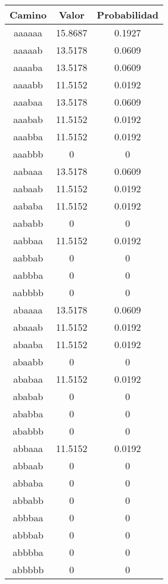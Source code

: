 \begin{figure}[hbpt]
\begin{minipage}{0.48\textwidth}
\begin{center}
\begin{tabular}{|c|c|c|}
\hline
\textbf{Camino} & \textbf{Valor} & \textbf{Probabilidad} \\
\hline
aaaaaa  &  15.8687  &  0.1927  \\
aaaaab  &  13.5178  &  0.0609  \\
aaaaba  &  13.5178  &  0.0609  \\
aaaabb  &  11.5152  &  0.0192  \\
aaabaa  &  13.5178  &  0.0609  \\
aaabab  &  11.5152  &  0.0192  \\
aaabba  &  11.5152  &  0.0192  \\
aaabbb  & 0 & 0 \\
aabaaa  &  13.5178  &  0.0609  \\
aabaab  &  11.5152  &  0.0192  \\
aababa  &  11.5152  &  0.0192  \\
aababb  & 0 & 0 \\
aabbaa  &  11.5152  &  0.0192  \\
aabbab  & 0 & 0 \\
aabbba  & 0 & 0 \\
aabbbb  & 0 & 0 \\
abaaaa  &  13.5178  &  0.0609  \\
abaaab  &  11.5152  &  0.0192  \\
abaaba  &  11.5152  &  0.0192  \\
abaabb  & 0 & 0 \\
ababaa  &  11.5152  &  0.0192  \\
ababab  & 0 & 0 \\
ababba  & 0 & 0 \\
ababbb  & 0 & 0 \\
abbaaa  &  11.5152  &  0.0192  \\
abbaab  & 0 & 0 \\
abbaba  & 0 & 0 \\
abbabb  & 0 & 0 \\
abbbaa  & 0 & 0 \\
abbbab  & 0 & 0 \\
abbbba  & 0 & 0 \\
abbbbb  & 0 & 0 \\


\end{tabular}
\end{center}
\end{minipage}
\end{figure}

